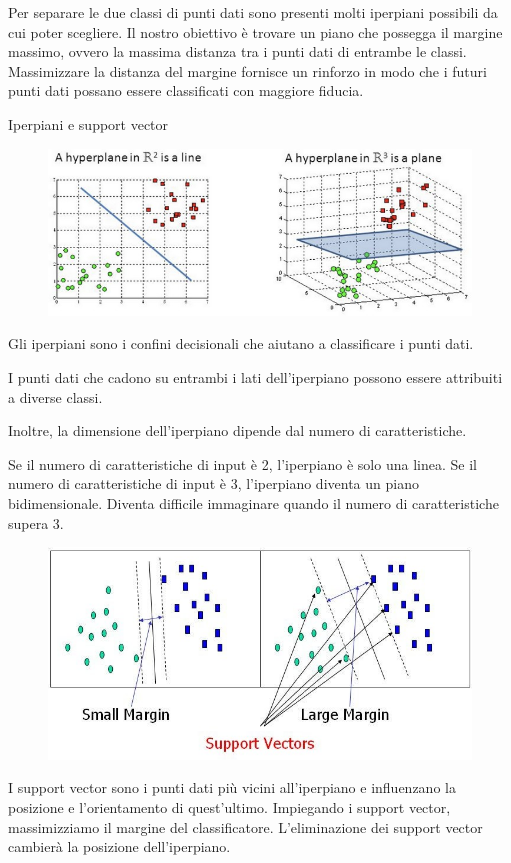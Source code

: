 Per separare le due classi di punti dati sono presenti molti iperpiani possibili da cui poter scegliere. Il nostro obiettivo è trovare un piano che possegga il margine massimo, ovvero la massima distanza tra i punti dati di entrambe le classi. Massimizzare la distanza del margine fornisce un rinforzo in modo che i futuri punti dati possano essere classificati con maggiore fiducia.

Iperpiani e support vector
\begin{figure}
    \begin{center}    
        \includegraphics[width=0.9\linewidth]{images/image27.jpeg}
    \end{center}
\end{figure}
Gli iperpiani sono i confini decisionali che aiutano a classificare i punti dati. 

I punti dati che cadono su entrambi i lati dell'iperpiano possono essere attribuiti a diverse classi. 

Inoltre, la dimensione dell’iperpiano  dipende dal numero di caratteristiche. 

Se il numero di caratteristiche di input è 2, l'iperpiano è solo una linea. Se il numero di caratteristiche di input è 3, l'iperpiano diventa un piano bidimensionale. Diventa difficile immaginare quando il numero di caratteristiche supera 3.
\begin{figure}
    \begin{center}    
        \includegraphics[width=0.9\linewidth]{images/image28.jpeg}
    \end{center}
\end{figure}
I support vector sono i punti dati più vicini all'iperpiano e inﬂuenzano la posizione e l'orientamento di quest’ultimo. Impiegando i support vector, massimizziamo il margine del classificatore. L’eliminazione  dei support vector cambierà la posizione dell'iperpiano. 

